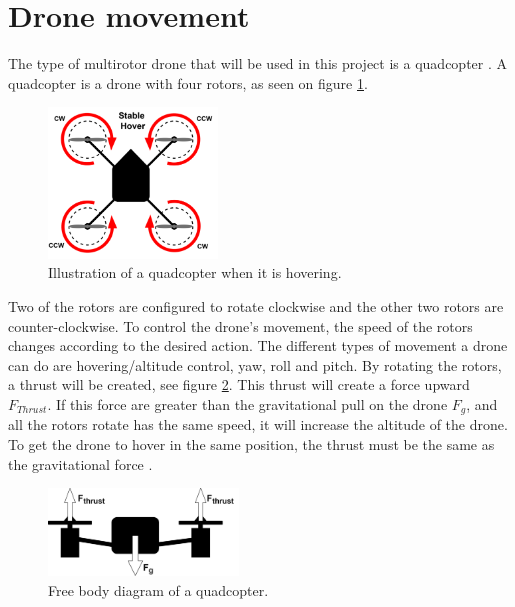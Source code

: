 \section{Drone movement}
The type of multirotor drone that will be used in this project is a quadcopter \cite{PhysicsofDroneFlight}. A quadcopter is a drone with four rotors, as seen on figure \ref{fig:dronePhysics_1}.
\begin{figure}[H]
    \centering
    \includegraphics[width=0.4\textwidth]{figures/ch_intro/physics-of-multirotor.png}
    \caption{Illustration of a quadcopter when it is hovering.}
    \label{fig:dronePhysics_1}
\end{figure}
Two of the rotors are configured to rotate clockwise and the other two rotors are counter-clockwise. To control the drone’s movement, the speed of the rotors changes according to the desired action. The different types of movement a drone can do are hovering/altitude control, yaw, roll and pitch.
\newline
\newline
By rotating the rotors, a thrust will be created, see figure \ref{fig:QC_freeBodyDiagram}. This thrust will create a force upward $F_{Thrust}$. If this force are greater than the gravitational pull on the drone $F_g$, and all the rotors rotate has the same speed, it will increase the altitude of the drone. To get the drone to hover in the same position, the thrust must be the same as the gravitational force \cite{PhysicsofDroneFlight}.
\begin{figure}[H]
    \centering
    \includegraphics[width=0.45\textwidth]{figures/ch_intro/droen_frit_legeme-diagram.png}
    \caption{Free body diagram of a quadcopter.}
    \label{fig:QC_freeBodyDiagram}
\end{figure}
